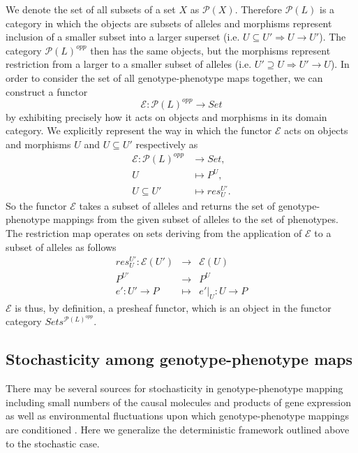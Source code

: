 \documentclass[10pt]{article}
\begin{document}
We denote the set of all subsets of a set $X$ as $\mathcal{P}(X)$. Therefore $\mathcal{P}(L)$ is a category in which the objects are subsets of alleles and morphisms represent inclusion of a smaller subset into a larger superset (i.e. $U \subseteq U' \Rightarrow U \rightarrow U'$). The category $\mathcal{P}(L)^{opp}$ then has the same objects, but the morphisms represent restriction from a larger to a smaller subset of alleles (i.e. $U' \supseteq U \Rightarrow U' \rightarrow U$). In order to consider the set of all genotype-phenotype maps together, we can construct a functor
$$
\mathcal{E} \colon \mathcal{P}(L)^{opp} \rightarrow Set
$$
by exhibiting precisely how it acts on objects and morphisms in its domain category. We explicitly represent the way in which the functor $\mathcal{E}$ acts on objects and morphisms $U$ and $U \subseteq U'$ respectively as
\begin{equation}\label{eq:gpfunctor}
\begin{split}
\mathcal{E} \colon \mathcal{P}(L)^{opp} &\rightarrow Set,\\
U &\mapsto P^U,\\
U \subseteq U' &\mapsto res^{U'}_{U}.
\end{split}
\end{equation}
So the functor $\mathcal{E}$ takes a subset of alleles and returns the set of genotype-phenotype mappings from the given subset of alleles to the set of phenotypes. The restriction map operates on sets deriving from the application of $\mathcal{E}$ to a subset of alleles as follows
\begin{eqnarray*}
res^{U'}_{U} \colon \mathcal{E}(U') &\rightarrow& \mathcal{E}(U)\\
P^{U'} &\rightarrow& P^U\\
e' \colon U' \rightarrow P &\mapsto& e'|_U \colon U \rightarrow P
\end{eqnarray*}
$\mathcal{E}$ is thus, by definition, a presheaf functor, which is an object in the functor category $Sets^{\mathcal{P}(L)^{opp}}$.

\subsection*{Stochasticity among genotype-phenotype maps}
There may be several sources for stochasticity in genotype-phenotype mapping including small numbers of the causal molecules and products of gene expression as well as environmental fluctuations upon which genotype-phenotype mappings are conditioned \cite{Swain2002,Paulsson2004,Thattai2004,Acar2008a,Lestas2010,Munsky2012,Neuert2013}. Here we generalize the deterministic framework outlined above to the stochastic case.
\end{document}

